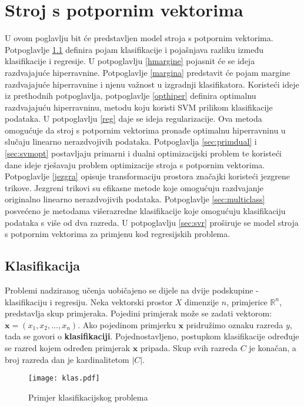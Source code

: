 \documentclass[times, utf8, zavrsni, numeric]{fer}
\begin{document}
\chapter{Stroj s potpornim vektorima} \label{svm}
U ovom poglavlju bit će predstavljen model stroja s potpornim vektorima. 
Potpoglavlje \ref{klasifikacija} definira pojam klasifikacije i pojašnjava razliku između klasifikacije i regresije.
U potpoglavlju \ref{hmargine} pojasnit će se ideja razdvajajuće hiperravnine.
Potpoglavlje \ref{margina} predstavit će pojam margine razdvajajuće hiperravnine i njenu važnost u izgradnji
klasifikatora.
Koristeći ideje iz prethodnih potpoglavlja, potpoglavlje \ref{opthiper} definira optimalnu razdvajajuću hiperravninu,
metodu koju koristi SVM prilikom klasifikacije podataka.
U potpoglavlju \ref{reg} daje se ideja regularizacije. Ova metoda omogućuje da stroj s potpornim vektorima
pronađe optimalnu hiperravninu u slučaju linearno nerazdvojivih podataka.
Potpoglavlja \ref{sec:primdual} i \ref{sec:svmopt} postavljaju primarni i dualni optimizacijski problem 
te koristeći dane ideje rješavaju problem optimizacije stroja s potpornim vektorima.
Potpoglavlje \ref{jezgra} opisuje transformaciju prostora značajki koristeći jezgrene trikove.
Jezgreni trikovi su efikasne metode koje omogućuju razdvajanje originalno linearno nerazdvojivih podataka.
Potpoglavlje \ref{sec:multiclass} posvećeno je metodama višerazredne klasifikacije koje omogućuju
klasifikaciju podataka s više od dva razreda.
U potpoglavlju \ref{sec:svr} proširuje se model stroja s potpornim vektorima za primjenu kod regresijskih
problema.


\section{Klasifikacija} \label{klasifikacija}
Problemi nadziranog učenja uobičajeno se dijele na dvije podskupine - klasifikaciju i regresiju.
Neka vektorski prostor $\textit{X}$ dimenzije $n$, primjerice $\mathbb{R}^n$, predstavlja skup primjeraka. 
Pojedini primjerak može se zadati vektorom: $\mathbf{x}=(x_1,x_2,\dots,x_n)$.
Ako pojedinom primjerku $\mathbf{x}$ pridružimo oznaku razreda $y$, tada se govori o \textbf{klasifikaciji}.
Pojednostavljeno, postupkom klasifikacije određuje se razred kojem određen primjerak $\mathbf{x}$ pripada.
Skup svih razreda $\textit{C}$ je konačan, a broj razreda dan je kardinalitetom $\left\vert{C}\right\vert$.

\begin{figure}
\centering
\texttt{[image: klas.pdf]}
\caption{Primjer klasifikacijskog problema}
\label{fig:klas}
\end{figure}
\end{document}

